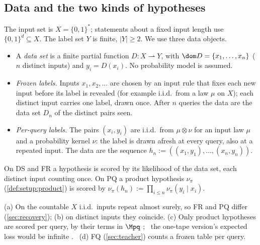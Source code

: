 \subsection{Data and the two kinds of hypotheses}\label{sec:setup:hyp}

\begin{definition}[Data]\label{def:setup:data}
The input set is $X=\{0,1\}^*$; statements about a fixed input length use $\{0,1\}^d\subseteq X$. The label set $Y$ is finite, $|Y|\ge2$. We use three data objects.
\begin{itemize}[itemsep=0pt,topsep=2pt]
\item[(DS)] A \emph{data set} is a finite partial function $D:X\rightharpoonup Y$, with $\dom D=\{x_1,\dots,x_n\}$ ($n$ distinct inputs) and $y_i=D(x_i)$. No probability model is assumed.
\item[(FR)] \emph{Frozen labels.} Inputs $x_1,x_2,\dots$ are chosen by an input rule that fixes each new input before its label is revealed (for example i.i.d.\ from a law $\mu$ on $X$); each distinct input carries one label, drawn once. After $n$ queries the data are the data set $D_n$ of the distinct pairs seen.
\item[(PQ)] \emph{Per-query labels.} The pairs $(x_i,y_i)$ are i.i.d.\ from $\mu\otimes\nu$ for an input law $\mu$ and a probability kernel $\nu$: the label is drawn afresh at every query, also at a repeated input. The data are the sequence $h_n:=((x_1,y_1),\dots,(x_n,y_n))$.
\end{itemize}
On DS and FR a hypothesis is scored by its likelihood of the data set, each distinct input counting once. On PQ a product hypothesis $\nu_\pi$ (\cref{def:setup:product}) is scored by $\nu_\pi(h_n):=\prod_{i\le n}\nu_\pi(y_i\mid x_i)$.
\end{definition}

\begin{remark}\label{rem:setup:objects}
(a) On the countable $X$ i.i.d.\ inputs repeat almost surely, so FR and PQ differ (\cref{sec:recovery}); (b) on distinct inputs they coincide. (c) Only product hypotheses are scored per query, by their terms in $\Mpq$ \citep[Proposition~5.7]{claudeSFI2026fundamentals};%
\ the one-tape version's expected loss would be infinite \citep[Proposition~5.6]{claudeSFI2026fundamentals}.%
\ (d) FQ (\cref{sec:teacher}) counts a frozen table per query.
\end{remark}

